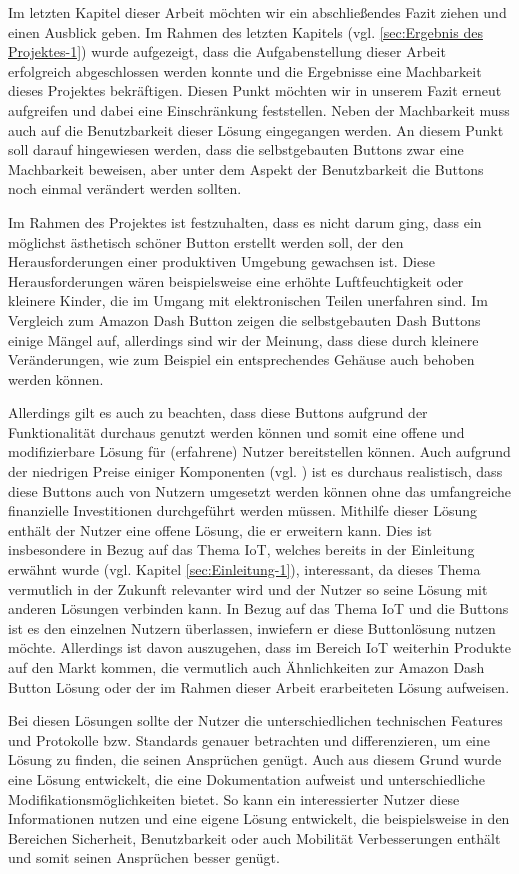 Im letzten Kapitel dieser Arbeit möchten wir ein abschließendes Fazit ziehen und einen Ausblick geben. Im Rahmen des letzten Kapitels (vgl. \ref{sec:Ergebnis des Projektes-1}) wurde aufgezeigt, dass die Aufgabenstellung dieser Arbeit erfolgreich abgeschlossen werden konnte und die Ergebnisse eine Machbarkeit dieses Projektes bekräftigen. Diesen Punkt möchten wir in unserem Fazit erneut aufgreifen und dabei eine Einschränkung feststellen. Neben der Machbarkeit muss auch auf die Benutzbarkeit dieser Lösung eingegangen werden. An diesem Punkt soll  darauf hingewiesen werden, dass die selbstgebauten Buttons zwar eine Machbarkeit beweisen, aber unter dem Aspekt der Benutzbarkeit die Buttons noch einmal verändert werden sollten. 

Im Rahmen des Projektes ist festzuhalten, dass es nicht darum ging, dass ein möglichst ästhetisch schöner Button erstellt werden soll, der den Herausforderungen einer produktiven Umgebung gewachsen ist. Diese Herausforderungen wären beispielsweise eine erhöhte Luftfeuchtigkeit oder kleinere Kinder, die im Umgang mit elektronischen Teilen unerfahren sind. Im Vergleich zum Amazon Dash Button zeigen die selbstgebauten Dash Buttons einige Mängel auf, allerdings sind wir der Meinung, dass diese durch kleinere Veränderungen, wie zum Beispiel ein entsprechendes Gehäuse auch behoben werden können. 

Allerdings gilt es auch zu beachten, dass diese Buttons aufgrund der Funktionalität durchaus genutzt werden können und somit eine offene und modifizierbare Lösung für (erfahrene) Nutzer bereitstellen können. Auch aufgrund der niedrigen Preise einiger Komponenten (vgl. \cite{.t}) ist es durchaus realistisch, dass diese Buttons auch von Nutzern umgesetzt werden können ohne das umfangreiche finanzielle Investitionen durchgeführt werden müssen. 
Mithilfe dieser Lösung enthält der Nutzer eine offene Lösung, die er erweitern kann. Dies ist insbesondere in Bezug auf das Thema \ac{IoT}, welches bereits in der Einleitung erwähnt wurde (vgl. Kapitel \ref{sec:Einleitung-1}), interessant, da dieses Thema vermutlich in der Zukunft relevanter wird und der Nutzer so seine Lösung mit anderen Lösungen verbinden kann. In Bezug auf das Thema \ac{IoT} und die Buttons ist es den einzelnen Nutzern überlassen, inwiefern er diese Buttonlösung nutzen möchte. Allerdings ist davon auszugehen, dass im Bereich \ac{IoT} weiterhin Produkte auf den Markt kommen, die vermutlich auch Ähnlichkeiten zur Amazon Dash Button Lösung oder der im Rahmen dieser Arbeit erarbeiteten Lösung aufweisen. 

Bei diesen Lösungen sollte der Nutzer die unterschiedlichen technischen Features und Protokolle bzw. Standards genauer betrachten und differenzieren, um eine Lösung zu finden, die seinen Ansprüchen genügt. 
Auch aus diesem Grund wurde eine Lösung entwickelt, die eine Dokumentation aufweist und unterschiedliche Modifikationsmöglichkeiten bietet. So kann ein interessierter Nutzer diese Informationen nutzen und eine eigene Lösung entwickelt, die beispielsweise in den Bereichen Sicherheit, Benutzbarkeit oder auch Mobilität Verbesserungen enthält und somit seinen Ansprüchen besser genügt. 